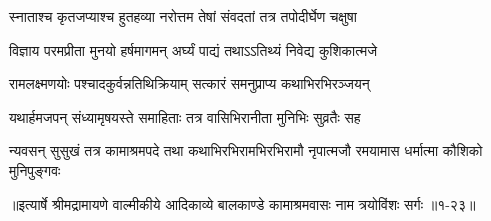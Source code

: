 \twolineshloka
{स्नाताश्च कृतजप्याश्च हुतहव्या नरोत्तम}
{तेषां संवदतां तत्र तपोदीर्घेण चक्षुषा} %

\twolineshloka
{विज्ञाय परमप्रीता मुनयो हर्षमागमन्}
{अर्घ्यं पाद्यं तथाऽऽतिथ्यं निवेद्य कुशिकात्मजे} %

\twolineshloka
{रामलक्ष्मणयोः पश्चादकुर्वन्नतिथिक्रियाम्}
{सत्कारं समनुप्राप्य कथाभिरभिरञ्जयन्} %

\twolineshloka
{यथार्हमजपन् संध्यामृषयस्ते समाहिताः}
{तत्र वासिभिरानीता मुनिभिः सुव्रतैः सह} %

\threelineshloka
{न्यवसन् सुसुखं तत्र कामाश्रमपदे तथा}
{कथाभिरभिरामभिरभिरामौ नृपात्मजौ}
{रमयामास धर्मात्मा कौशिको मुनिपुङ्गवः} %


॥इत्यार्षे श्रीमद्रामायणे वाल्मीकीये आदिकाव्ये बालकाण्डे कामाश्रमवासः नाम त्रयोविंशः सर्गः ॥१-२३॥
